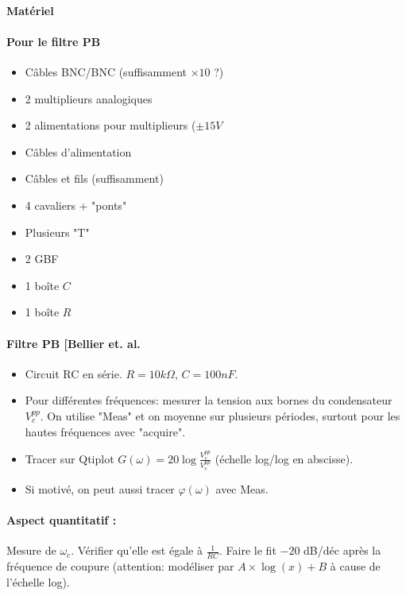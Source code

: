\documentclass[11pt]{report}
\numberwithin{figure}{section}
\numberwithin{equation}{section}
\numberwithin{table}{section}
\newcommand{\1}{\boldsymbol{1}}
\begin{document}
\begin{tcolorbox}[breakable, enhanced, colback=red!2!white,colframe=mycolor!85!black,title=\textbf{\textbf{Expérience}}]
\paragraph*{Matériel}
\paragraph*{Pour le filtre PB}
\begin{itemize}
\item Câbles BNC/BNC (suffisamment $\times 10$ ?)
\item 2 multiplieurs analogiques
\item 2 alimentations pour multiplieurs ($\pm 15V$
\item Câbles d'alimentation
\item Câbles et fils (suffisamment)
\item 4 cavaliers + "ponts"
\item Plusieurs "T"
\item 2 GBF
\item 1 boîte $C$
\item 1 boîte $R$
\end{itemize}


\paragraph*{Filtre PB [Bellier et. al.} 

\begin{itemize}[label=$\triangleright$]
		\item  Circuit RC en série. $R = 10 k\Omega$, $C = 100 nF$.
		\item Pour différentes fréquences: mesurer la tension aux bornes du condensateur $V_c^{pp}$. On utilise "Meas" et on moyenne sur plusieurs périodes, surtout pour les hautes fréquences avec "acquire".
		\item Tracer sur Qtiplot $G(\omega) = 20 \log \frac{V_c^{pp}}{V_e^{pp}}$ (échelle log/log en abscisse).
		\item Si motivé, on peut aussi tracer $\varphi(\omega)$ avec Meas.
\end{itemize}

\paragraph*{Aspect quantitatif :} Mesure de $\omega_c$. Vérifier qu'elle est égale à $\frac{1}{RC}$. Faire le fit $-20$ dB/déc après la fréquence de coupure (attention: modéliser par $A \times \log(x) + B$ à cause de l'échelle log).


\end{tcolorbox}
\end{document}
